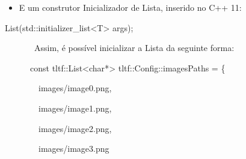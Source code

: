 \documentclass[a4paper]{article}
\newcommand\liststyleWWNumvi{%
\renewcommand\labelitemi{[F0B7?]}
\renewcommand\labelitemii{o}
\renewcommand\labelitemiii{[F0A7?]}
\renewcommand\labelitemiv{[F0B7?]}
}
\begin{document}
\liststyleWWNumvi
\begin{itemize}
\item E um construtor Inicializador de Lista, inserido no C++ 11:
\end{itemize}
\foreignlanguage{english}{\textcolor[rgb]{0.3254902,0.5058824,0.20784314}{List(std::initializer\_list{\textless}T{\textgreater}
args);}}

\foreignlanguage{english}{\ \ \ \  \ \ \ }Assim, é possível inicializar
a Lista da seguinte forma:

\ \ \ \ \ \ \foreignlanguage{english}{\textcolor[rgb]{0.3372549,0.6117647,0.8392157}{const}}\foreignlanguage{english}{\textcolor[rgb]{0.8627451,0.8627451,0.8627451}{
}}\foreignlanguage{english}{\textcolor[rgb]{0.3254902,0.5058824,0.20784314}{tltf::List}}\foreignlanguage{english}{\textcolor[rgb]{0.7058824,0.7058824,0.7058824}{{\textless}}}\foreignlanguage{english}{\textcolor[rgb]{0.3372549,0.6117647,0.8392157}{char}}\foreignlanguage{english}{\textcolor[rgb]{0.7058824,0.7058824,0.7058824}{*{\textgreater}}}\foreignlanguage{english}{\textcolor[rgb]{0.8627451,0.8627451,0.8627451}{
}}\foreignlanguage{english}{\textcolor[rgb]{0.3254902,0.5058824,0.20784314}{tltf::Config::imagesPaths
}}\foreignlanguage{english}{\textcolor[rgb]{0.7058824,0.7058824,0.7058824}{=}}\foreignlanguage{english}{\textcolor[rgb]{0.8627451,0.8627451,0.8627451}{
}}\foreignlanguage{english}{\textcolor[rgb]{0.7058824,0.7058824,0.7058824}{\{}}

\foreignlanguage{english}{\textcolor[rgb]{0.8627451,0.8627451,0.8627451}{\ \ \ \ \ \ \ \ }}\foreignlanguage{english}{\textcolor[rgb]{0.8392157,0.6156863,0.52156866}{{\textquotedbl}images/image0.png{\textquotedbl}}}\foreignlanguage{english}{\textcolor[rgb]{0.7058824,0.7058824,0.7058824}{,}}

\foreignlanguage{english}{\textcolor[rgb]{0.8627451,0.8627451,0.8627451}{\ \ \ \ \ \ \ \ }}\foreignlanguage{english}{\textcolor[rgb]{0.8392157,0.6156863,0.52156866}{{\textquotedbl}images/image1.png{\textquotedbl}}}\foreignlanguage{english}{\textcolor[rgb]{0.7058824,0.7058824,0.7058824}{,}}

\foreignlanguage{english}{\textcolor[rgb]{0.8627451,0.8627451,0.8627451}{\ \ \ \ \ \ \ \ }}\foreignlanguage{english}{\textcolor[rgb]{0.8392157,0.6156863,0.52156866}{{\textquotedbl}images/image2.png{\textquotedbl}}}\foreignlanguage{english}{\textcolor[rgb]{0.7058824,0.7058824,0.7058824}{,}}

\foreignlanguage{english}{\textcolor[rgb]{0.8627451,0.8627451,0.8627451}{\ \ \ \ \ \ \ \ }}\foreignlanguage{english}{\textcolor[rgb]{0.8392157,0.6156863,0.52156866}{{\textquotedbl}images/image3.png{\textquotedbl}}}
\end{document}
